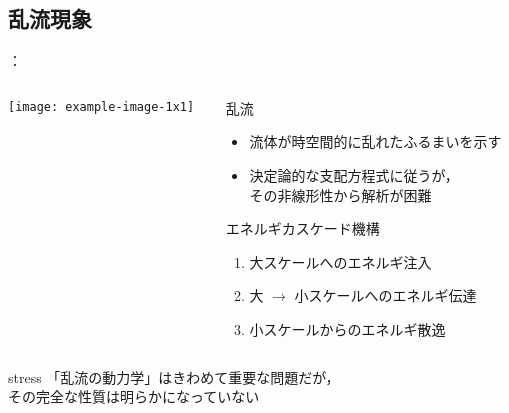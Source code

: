\documentclass[12pt,dvipdfmx,svgnames,uplatex,aspectratio=169]{beamer}
\begin{document}
\subsection{乱流現象}
\begin{frame}{\insertsection：\insertsubsection}
  \begin{columns}[c]
    \begin{column}{0.4\textwidth}
      \centering
      \texttt{[image: example-image-1x1]}
    \end{column}
    \begin{column}{0.6\textwidth}
      \begin{block}{乱流}
        \begin{itemize}
          \item 流体が時空間的に乱れたふるまいを示す
          \item 決定論的な支配方程式に従うが，\\
            その非線形性から解析が困難
        \end{itemize}
      \end{block}
      \pause
      \begin{block}{エネルギカスケード機構}
        \begin{enumerate}
          \item 大スケールへのエネルギ注入
          \item 大 \(\to\) 小スケールへのエネルギ伝達
          \item 小スケールからのエネルギ散逸
        \end{enumerate}
      \end{block}
    \end{column}
  \end{columns}
  \vspace{\baselineskip}
  \pause
  \hfill
  \begin{beamercolorbox}[rounded=true, wd=0.8\textwidth]{stress}
    \centering
    「乱流の動力学」はきわめて重要な問題だが，\\その完全な性質は明らかになっていない
  \end{beamercolorbox}
  \hfill\hfill
\end{frame}
\end{document}
